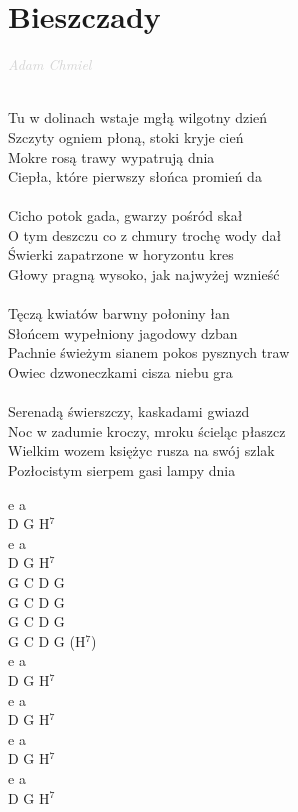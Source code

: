 \documentclass[a5paper, 10pt]{book}
\begin{document}
\section{Bieszczady}\textcolor{lightgray}{\textit{Adam Chmiel}}\\~\\
\begin{minipage}[t]{0.7\textwidth}
  Tu w dolinach wstaje mgłą wilgotny dzień\\
  Szczyty ogniem płoną, stoki kryje cień			\\
  Mokre rosą trawy wypatrują dnia\\
  Ciepła, które pierwszy słońca promień da\\
  \\
  \hspace*{5mm}Cicho potok gada, gwarzy pośród skał			\\
  \hspace*{5mm}O tym deszczu co z chmury trochę wody dał\\
  \hspace*{5mm}Świerki zapatrzone w horyzontu kres\\
  \hspace*{5mm}Głowy pragną wysoko, jak najwyżej wznieść\\
  \\
  Tęczą kwiatów barwny połoniny łan\\
  Słońcem wypełniony jagodowy dzban\\
  Pachnie świeżym sianem pokos pysznych traw\\
  Owiec dzwoneczkami cisza niebu gra\\
  \\
  Serenadą świerszczy, kaskadami gwiazd\\
  Noc w zadumie kroczy, mroku ścieląc płaszcz\\
  Wielkim wozem księżyc rusza na swój szlak\\
  Pozłocistym sierpem gasi lampy dnia\\

\end{minipage}
\begin{minipage}[t]{0.3\textwidth}
  e a\\
  D G H$^7$\\
  e a\\
  D G H$^7$\\

  G C D G\\
  G C D G\\
  G C D G\\
  G C D G (H$^7$)\\

  e a\\
  D G H$^7$\\
  e a\\
  D G H$^7$\\

  e a\\
  D G H$^7$\\
  e a\\
  D G H$^7$\\
\end{minipage}
\end{document}
